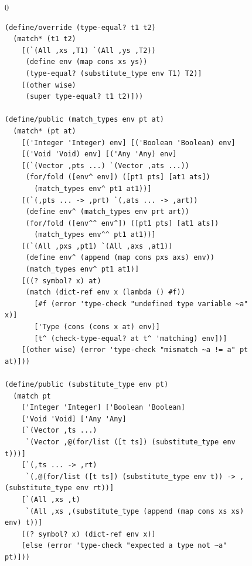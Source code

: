 \documentclass[7x10]{TimesAPriori_MIT}%
\def\racketEd{0}
\providecommand{\BookEdition}{1}
\let\edition\BookEdition
\numberwithin{theorem}{chapter}
\numberwithin{definition}{chapter}
\numberwithin{equation}{chapter}
\begin{document}
\begin{figure}[tbp]
\begin{tcolorbox}[colback=white]  
{\if\edition\racketEd    
\begin{lstlisting}[basicstyle=\ttfamily\scriptsize]
(define/override (type-equal? t1 t2)
  (match* (t1 t2)
    [(`(All ,xs ,T1) `(All ,ys ,T2))
     (define env (map cons xs ys))
     (type-equal? (substitute_type env T1) T2)]
    [(other wise)
     (super type-equal? t1 t2)]))

(define/public (match_types env pt at)
  (match* (pt at)
    [('Integer 'Integer) env] [('Boolean 'Boolean) env]
    [('Void 'Void) env] [('Any 'Any) env]
    [(`(Vector ,pts ...) `(Vector ,ats ...))
     (for/fold ([env^ env]) ([pt1 pts] [at1 ats])
       (match_types env^ pt1 at1))]
    [(`(,pts ... -> ,prt) `(,ats ... -> ,art))
     (define env^ (match_types env prt art))
     (for/fold ([env^^ env^]) ([pt1 pts] [at1 ats])
       (match_types env^^ pt1 at1))]
    [(`(All ,pxs ,pt1) `(All ,axs ,at1))
     (define env^ (append (map cons pxs axs) env))
     (match_types env^ pt1 at1)]
    [((? symbol? x) at)
     (match (dict-ref env x (lambda () #f))
       [#f (error 'type-check "undefined type variable ~a" x)]
       ['Type (cons (cons x at) env)]
       [t^ (check-type-equal? at t^ 'matching) env])]
    [(other wise) (error 'type-check "mismatch ~a != a" pt at)]))

(define/public (substitute_type env pt)
  (match pt
    ['Integer 'Integer] ['Boolean 'Boolean]
    ['Void 'Void] ['Any 'Any]
    [`(Vector ,ts ...)
     `(Vector ,@(for/list ([t ts]) (substitute_type env t)))]
    [`(,ts ... -> ,rt)
     `(,@(for/list ([t ts]) (substitute_type env t)) -> ,(substitute_type env rt))]
    [`(All ,xs ,t)
     `(All ,xs ,(substitute_type (append (map cons xs xs) env) t))]
    [(? symbol? x) (dict-ref env x)]
    [else (error 'type-check "expected a type not ~a" pt)]))


\end{lstlisting}}
\end{tcolorbox}
\end{figure}
\end{document}
